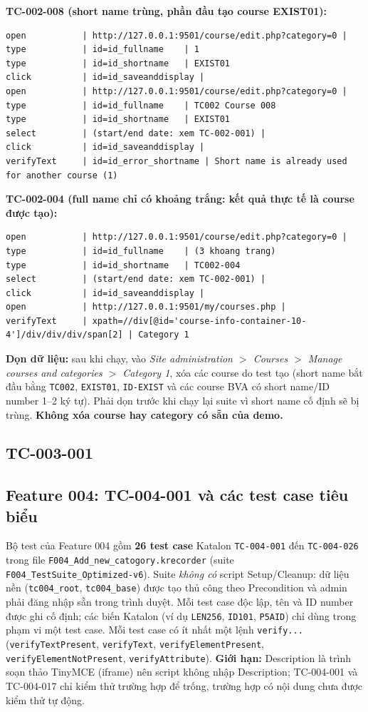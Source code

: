 \documentclass[12pt,a4paper]{article}
\begin{document}
\textbf{TC-002-008 (short name trùng, phần đầu tạo course EXIST01):}
\begin{lstlisting}
open           | http://127.0.0.1:9501/course/edit.php?category=0 |
type           | id=id_fullname    | 1
type           | id=id_shortname   | EXIST01
click          | id=id_saveanddisplay |
open           | http://127.0.0.1:9501/course/edit.php?category=0 |
type           | id=id_fullname    | TC002 Course 008
type           | id=id_shortname   | EXIST01
select         | (start/end date: xem TC-002-001) |
click          | id=id_saveanddisplay |
verifyText     | id=id_error_shortname | Short name is already used for another course (1)
\end{lstlisting}

\textbf{TC-002-004 (full name chỉ có khoảng trắng: kết quả thực tế là course được tạo):}
\begin{lstlisting}
open           | http://127.0.0.1:9501/course/edit.php?category=0 |
type           | id=id_fullname    | (3 khoang trang)
type           | id=id_shortname   | TC002-004
select         | (start/end date: xem TC-002-001) |
click          | id=id_saveanddisplay |
open           | http://127.0.0.1:9501/my/courses.php |
verifyText     | xpath=//div[@id='course-info-container-10-4']/div/div/div/span[2] | Category 1
\end{lstlisting}

\textbf{Dọn dữ liệu:} sau khi chạy, vào \textit{Site administration $>$ Courses $>$ Manage courses and categories $>$ Category 1},
xóa các course do test tạo (short name bắt đầu bằng \texttt{TC002}, \texttt{EXIST01}, \texttt{ID-EXIST} và các course BVA
có short name/ID number 1--2 ký tự). Phải dọn trước khi chạy lại suite vì short name cố định sẽ bị trùng.
\textbf{Không xóa course hay category có sẵn của demo.}

\subsection{TC-003-001}
\subsection{Feature 004: TC-004-001 và các test case tiêu biểu}
Bộ test của Feature 004 gồm \textbf{26 test case} Katalon \texttt{TC-004-001} đến \texttt{TC-004-026} trong file
\texttt{F004\_Add\_new\_catogory.krecorder} (suite \texttt{F004\_TestSuite\_Optimized-v6}). Suite \emph{không có} script Setup/Cleanup:
dữ liệu nền (\texttt{tc004\_root}, \texttt{tc004\_base}) được tạo thủ công theo Precondition và admin phải đăng nhập sẵn trong trình duyệt.
Mỗi test case độc lập, tên và ID number được ghi cố định; các biến Katalon (ví dụ \texttt{LEN256}, \texttt{ID101}, \texttt{P5AID}) chỉ dùng trong phạm vi
một test case. Mỗi test case có ít nhất một lệnh \texttt{verify...} (\texttt{verifyTextPresent}, \texttt{verifyText}, \texttt{verifyElementPresent},
\texttt{verifyElementNotPresent}, \texttt{verifyAttribute}). \textbf{Giới hạn:} Description là trình soạn thảo TinyMCE (iframe) nên script không nhập
Description; TC-004-001 và TC-004-017 chỉ kiểm thử trường hợp để trống, trường hợp có nội dung chưa được kiểm thử tự động.
\end{document}
